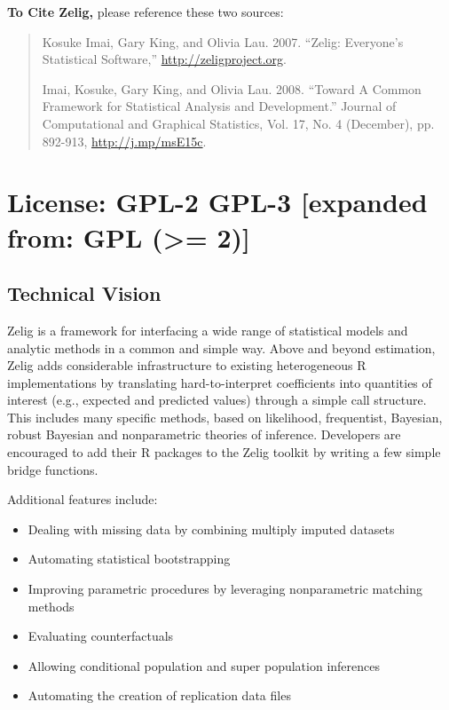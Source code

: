 \documentclass[letterpaper,10pt,english]{sphinxmanual}
\begin{document}
\textbf{To Cite Zelig,} please reference these two sources:
\begin{quote}

Kosuke Imai, Gary King, and Olivia Lau. 2007. ``Zelig: Everyone's Statistical Software,''  \href{http://zeligproject.org}{http://zeligproject.org}.

Imai, Kosuke, Gary King, and Olivia Lau. 2008. ``Toward A Common Framework for Statistical Analysis and Development.'' Journal of Computational and Graphical Statistics, Vol. 17, No. 4 (December), pp. 892-913, \href{http://j.mp/msE15c}{http://j.mp/msE15c}.
\end{quote}


\chapter{\textbf{License:} GPL-2 \textbar{} GPL-3 {[}expanded from: GPL (\textgreater{}= 2){]}}
\label{about:license-gpl-2-gpl-3-expanded-from-gpl-2}

\section{Technical Vision}
\label{about:technical-vision}
Zelig is a framework for interfacing a wide range of statistical models and analytic methods in a common and simple way. Above and beyond estimation, Zelig adds considerable infrastructure to existing heterogeneous R implementations by translating hard-to-interpret coefficients into quantities of interest (e.g., expected and predicted values) through a simple call structure. This includes many specific methods, based on likelihood, frequentist, Bayesian, robust Bayesian and nonparametric theories of inference. Developers are encouraged to add their R packages to the Zelig toolkit by writing a few simple bridge functions.

Additional features include:
\begin{itemize}
\item {} 
Dealing with missing data by combining multiply imputed datasets

\item {} 
Automating statistical bootstrapping

\item {} 
Improving parametric procedures by leveraging nonparametric matching methods

\item {} 
Evaluating counterfactuals

\item {} 
Allowing conditional population and super population inferences

\item {} 
Automating the creation of replication data files

\end{itemize}
\end{document}
